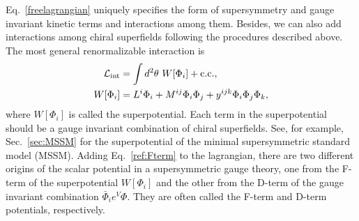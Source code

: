 \documentclass[12pt,twoside,book]{article}
\begin{document}
Eq.~\eqref{freelagrangian} uniquely specifies the form of supersymmetry and gauge invariant kinetic terms and interactions among them.
Besides, we can also add interactions among chiral superfields following the procedures described above.
The most general renormalizable interaction is
\begin{align}
 \mathcal{L}_{\rm int} &= \int d^2 \theta\ W[\Phi_i] + {\rm c.c.}, \label{ref:Fterm} \\
 W[\Phi_i] &= L^i \Phi_i + M^{ij} \Phi_i \Phi_j + y^{ijk} \Phi_i \Phi_j
 \Phi_k,
\end{align}
where $W[\Phi_i]$ is called the superpotential.
Each term in the superpotential should be a gauge invariant combination of chiral superfields.
See, for example, Sec.~\ref{sec:MSSM} for the superpotential of the minimal supersymmetric standard model (MSSM).
Adding Eq.~\eqref{ref:Fterm} to the lagrangian, there are two different origins of the scalar potential in a supersymmetric gauge theory, one from the F-term of the superpotential $W[\Phi_i]$ and the other from the D-term of the gauge invariant combination $\bar{\Phi}_i e^V \Phi$.
They are often called the F-term and D-term potentials, respectively.

% 
% 
\end{document}
